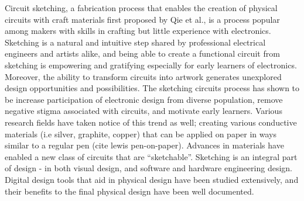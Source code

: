 \documentclass{sigchi}
\begin{document}
Circuit sketching, a fabrication process that enables the creation of physical circuits with craft materials first proposed by Qie et al., is a process popular among makers with skills in crafting but little experience with electronics. Sketching is a natural and intuitive step shared by professional electrical engineers and artists alike, and being able to create a functional circuit from sketching is empowering and gratifying especially for early learners of electronics. Moreover, the ability to transform circuits into artwork generates unexplored design opportunities and possibilities.  
The sketching circuits process has shown to be increase participation of electronic design from diverse population, remove negative stigma associated with circuits, and motivate early learners. Various research fields have taken notice of this trend as well; creating various conductive materials (i.e silver, graphite, copper) that can be applied on paper in ways similar to a regular pen (cite lewis pen-on-paper). Advances in materials have enabled a new class of circuits that are ``sketchable''. 
Sketching is an integral part of design - in both visual design, and software and hardware engineering design. Digital design tools that aid in physical design have been studied extensively, and their benefits to the final physical design have been well documented.
\end{document}
